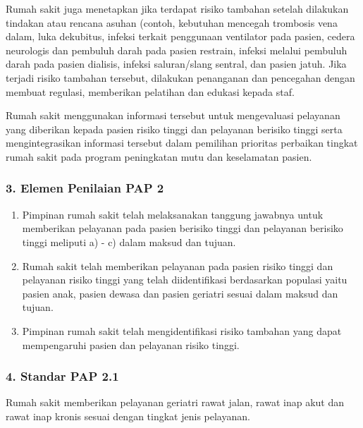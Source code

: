 \documentclass[
]{book}
\providecommand{\tightlist}{%
  \setlength{\itemsep}{0pt}\setlength{\parskip}{0pt}}
\begin{document}
Rumah sakit juga menetapkan jika terdapat risiko tambahan setelah dilakukan tindakan atau rencana asuhan (contoh, kebutuhan mencegah trombosis vena dalam, luka dekubitus, infeksi terkait penggunaan ventilator pada pasien, cedera neurologis dan pembuluh darah pada pasien restrain, infeksi melalui pembuluh darah pada pasien dialisis, infeksi saluran/slang sentral, dan pasien jatuh. Jika terjadi risiko tambahan tersebut, dilakukan penanganan dan pencegahan dengan membuat regulasi, memberikan pelatihan dan edukasi kepada staf.

Rumah sakit menggunakan informasi tersebut untuk mengevaluasi pelayanan yang diberikan kepada pasien risiko tinggi dan pelayanan berisiko tinggi serta mengintegrasikan informasi tersebut dalam pemilihan prioritas perbaikan tingkat rumah sakit pada program peningkatan mutu dan keselamatan pasien.

\hypertarget{elemen-penilaian-pap-2}{%
\subsubsection*{3. Elemen Penilaian PAP 2}\label{elemen-penilaian-pap-2}}

\begin{enumerate}
\def\labelenumi{\alph{enumi}.}
\tightlist
\item
  Pimpinan rumah sakit telah melaksanakan tanggung jawabnya untuk memberikan pelayanan pada pasien berisiko tinggi dan pelayanan berisiko tinggi meliputi a) - c) dalam maksud dan tujuan.
\item
  Rumah sakit telah memberikan pelayanan pada pasien risiko tinggi dan pelayanan risiko tinggi yang telah diidentifikasi berdasarkan populasi yaitu pasien anak, pasien dewasa dan pasien geriatri sesuai dalam maksud dan tujuan.
\item
  Pimpinan rumah sakit telah mengidentifikasi risiko tambahan yang dapat mempengaruhi pasien dan pelayanan risiko tinggi.
\end{enumerate}

\hypertarget{standar-pap-2.1}{%
\subsubsection*{4. Standar PAP 2.1}\label{standar-pap-2.1}}

Rumah sakit memberikan pelayanan geriatri rawat jalan, rawat inap akut dan rawat inap kronis sesuai dengan tingkat jenis pelayanan.
\end{document}
